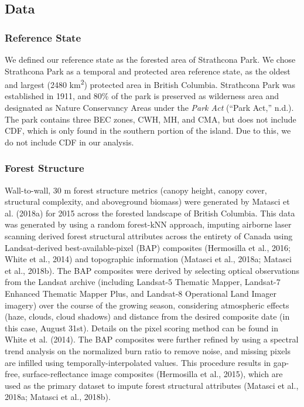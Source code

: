 \documentclass[
]{agujournal2019}
\begin{document}
\subsection{Data}\label{data}

\subsubsection{Reference State}\label{reference-state}

We defined our reference state as the forested area of Strathcona Park.
We chose Strathcona Park as a temporal and protected area reference
state, as the oldest and largest (2480 km\textsuperscript{2}) protected
area in British Columbia. Strathcona Park was established in 1911, and
80\% of the park is preserved as wilderness area and designated as
Nature Conservancy Areas under the \emph{Park Act} ({``Park {Act},''}
n.d.). The park contains three BEC zones, CWH, MH, and CMA, but does not
include CDF, which is only found in the southern portion of the island.
Due to this, we do not include CDF in our analysis.

\subsubsection{Forest Structure}\label{forest-structure}

Wall-to-wall, 30 m forest structure metrics (canopy height, canopy
cover, structural complexity, and aboveground biomass) were generated by
Matasci et al. (2018a) for 2015 across the forested landscape of British
Columbia. This data was generated by using a random forest-kNN approach,
imputing airborne laser scanning derived forest structural attributes
across the entirety of Canada using Landsat-derived best-available-pixel
(BAP) composites (Hermosilla et al., 2016; White et al., 2014) and
topographic information (Matasci et al., 2018a; Matasci et al., 2018b).
The BAP composites were derived by selecting optical observations from
the Landsat archive (including Landsat-5 Thematic Mapper, Landsat-7
Enhanced Thematic Mapper Plus, and Landsat-8 Operational Land Imager
imagery) over the course of the growing season, considering atmospheric
effects (haze, clouds, cloud shadows) and distance from the desired
composite date (in this case, August 31st). Details on the pixel scoring
method can be found in White et al. (2014). The BAP composites were
further refined by using a spectral trend analysis on the normalized
burn ratio to remove noise, and missing pixels are infilled using
temporally-interpolated values. This procedure results in gap-free,
surface-reflectance image composites (Hermosilla et al., 2015), which
are used as the primary dataset to impute forest structural attributes
(Matasci et al., 2018a; Matasci et al., 2018b).
\end{document}
